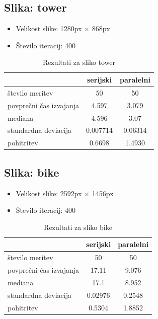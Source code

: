 \documentclass[11pt,a4paper]{article}
\begin{document}
\subsection{Slika: tower}

\begin{itemize}
\item Velikost slike: 1280px × 868px
\item Število iteracij: 400
\end{itemize}

\begin{table}[htbp]
\begin{center}
\begin{tabular}{|l|c|c|}
	\hline
		& serijski & paralelni  \\
	\hline
	število meritev & 50 & 50 \\
	\hline
	povprečni čas izvajanja & 4.597 & 3.079\\
    \hline
    mediana & 4.596  & 3.07\\
    \hline
    	standardna deviacija & 0.007714  & 0.06314\\
    \hline
    pohitritev & 0.6698 & 1.4930\\
    \hline
\end{tabular}
\end{center}

\caption{Rezultati za sliko tower}
\label{table:ta}
\end{table}

\pagebreak

\subsection{Slika: bike}

\begin{itemize}
\item Velikost slike: 2592px × 1456px
\item Število iteracij: 400
\end{itemize}

\begin{table}[htbp]
\begin{center}
\begin{tabular}{|l|c|c|}
	\hline
		& serijski & paralelni  \\
	\hline
	število meritev & 50 & 50\\
	\hline
	povprečni čas izvajanja & 17.11  & 9.076\\
    \hline
    mediana & 17.1  & 8.952\\
    \hline
    	standardna deviacija & 0.02976  & 0.2548 \\
    \hline
    pohitritev & 0.5304 & 1.8852 \\
    \hline
\end{tabular}
\end{center}

\caption{Rezultati za sliko bike}
\label{table:ta}
\end{table}
\end{document}
